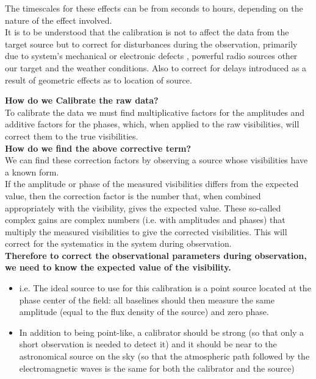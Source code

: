\documentclass[10pt]{report}
\newcommand{\tbf}[1]{\textbf{#1}}
\begin{document}
 The timescales for these effects can be from seconds to hours, depending on the nature of the effect involved. \\
 It is to be understood that the calibration is not to affect the data from the target source but to correct for disturbances during the observation, primarily due to system's mechanical or electronic defects , powerful radio sources other our target and the  weather conditions. Also to correct for delays introduced as a result of geometric effects as to location of source.
 
\tbf{How do we Calibrate the raw data?}\\
To calibrate the data we must find multiplicative factors for the amplitudes and additive factors for the phases, which, when applied to the raw visibilities, will correct them to the true visibilities.  \\

\tbf{How do we find the above corrective term?}\\
 We can find these correction factors by observing a source whose visibilities have a known form. \\
 If the amplitude or phase of the measured visibilities differs from the expected value, then the correction factor is the number that, when combined appropriately with the visibility, gives the expected value.  These so-called complex gains are complex numbers (i.e. with amplitudes and phases) that multiply the measured visibilities to give the corrected visibilities. This will correct for the systematics in the system during observation.\\
 
 \tbf{Therefore to correct the observational parameters during observation, we need to know the expected value of the visibility.}\\
 \begin{itemize}
\item i.e. The ideal source to use for this calibration is a point source located at the phase center of the field: all baselines should then measure the same amplitude (equal to the flux density of the source) and zero phase. 
\item   In addition to being point-like, a calibrator should be strong (so that only a short observation is needed to detect it) and it should be near to the astronomical source on the sky (so that the atmospheric path followed by the electromagnetic waves is the same for both the calibrator and the source)
 \end{itemize}
 
\end{document}
